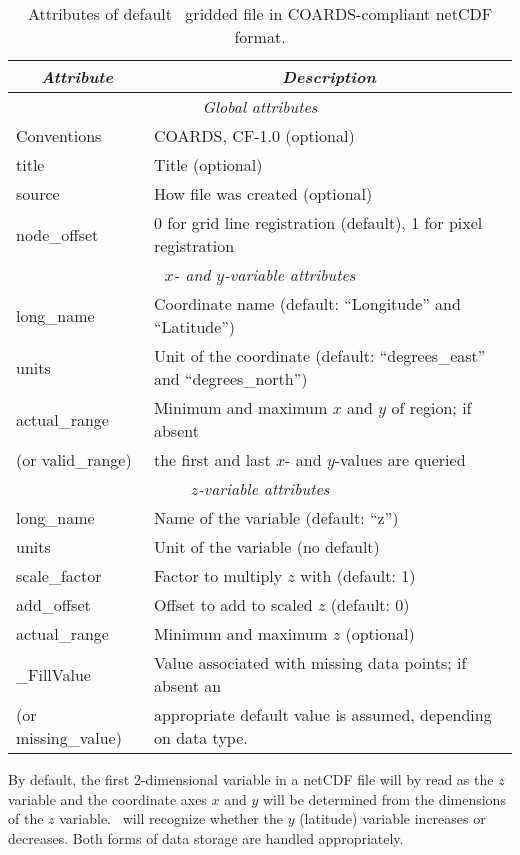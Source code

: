 \begin{table}
\centering
\begin{tabular}{|l|l|} \hline
\multicolumn{1}{|c}{\emph{Attribute}}   &       \multicolumn{1}{|c|}{\emph{Description}}        \\ \hline
\multicolumn{2}{|c|}{\emph{Global attributes}} \\ \hline
Conventions			& COARDS, CF-1.0 (optional) \\ \hline
title				& Title (optional) \\ \hline
source				& How file was created (optional) \\ \hline
node\_offset			& 0 for grid line registration (default), 1 for pixel registration \\ \hline
\multicolumn{2}{|c|}{\emph{$x$- and $y$-variable attributes}} \\ \hline
long\_name			& Coordinate name (default: ``Longitude'' and ``Latitude'') \\ \hline
units				& Unit of the coordinate (default: ``degrees\_east'' and ``degrees\_north'') \\ \hline
actual\_range			& Minimum and maximum $x$ and $y$ of region; if absent \\
(or valid\_range)		& the first and last $x$- and $y$-values are queried \\ \hline
\multicolumn{2}{|c|}{\emph{$z$-variable attributes}} \\ \hline
long\_name			& Name of the variable (default: ``z'') \\ \hline
units				& Unit of the variable (no default) \\ \hline
scale\_factor			& Factor to multiply $z$ with (default: 1) \\ \hline
add\_offset			& Offset to add to scaled $z$ (default: 0) \\ \hline
actual\_range			& Minimum and maximum $z$ (optional) \\ \hline
\_FillValue			& Value associated with missing data points; if absent an\\
(or missing\_value)		& appropriate default value is assumed, depending on data type. \\ \hline
\end{tabular} 
\caption{Attributes of default \gmt\ gridded file in COARDS-compliant netCDF format.}
\label{tbl:netcdf-format}
\end{table}

By default, the first 2-dimensional variable in a netCDF file will by read as the $z$ variable
and the coordinate axes $x$ and $y$ will be determined from the dimensions of the $z$ variable.
\GMT\ will recognize whether the $y$ (latitude) variable increases or decreases. Both forms of
data storage are handled appropriately.

